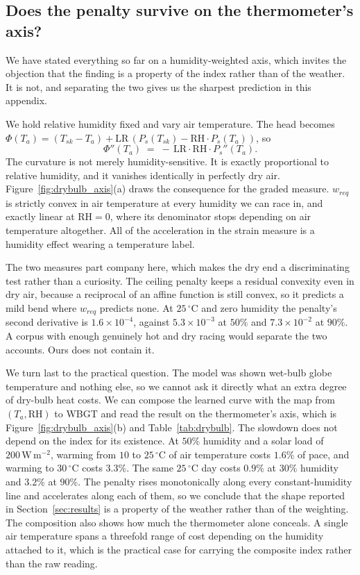 \subsection{Does the penalty survive on the thermometer's axis?}
\label{app:physics:drybulb}

We have stated everything so far on a humidity-weighted axis, which invites the
objection that the finding is a property of the index rather than of the
weather. It is not, and separating the two gives us the sharpest prediction in
this appendix.

We hold relative humidity fixed and vary air temperature. The head becomes
$\Phi(T_a) = (T_{sk} - T_a) + \mathrm{LR}\,(P_s(T_{sk}) - \mathrm{RH}\cdot
P_s(T_a))$, so
\begin{equation}
  \Phi''(T_a) \;=\; -\,\mathrm{LR}\cdot\mathrm{RH}\cdot P_s''(T_a).
  \label{eq:phi-rh}
\end{equation}
The curvature is not merely humidity-sensitive. It is exactly proportional to
relative humidity, and it vanishes identically in perfectly dry air.
Figure~\ref{fig:drybulb_axis}(a) draws the consequence for the graded measure.
$w_{req}$ is strictly convex in air temperature at every humidity we can race
in, and exactly linear at $\mathrm{RH} = 0$, where its denominator stops
depending on air temperature altogether. All of the acceleration in the strain
measure is a humidity effect wearing a temperature label.

The two measures part company here, which makes the dry end a discriminating
test rather than a curiosity. The ceiling penalty keeps a residual convexity
even in dry air, because a reciprocal of an affine function is still convex, so
it predicts a mild bend where $w_{req}$ predicts none. At $25\,^{\circ}$C and
zero humidity the penalty's second derivative is $1.6\times10^{-4}$, against
$5.3\times10^{-3}$ at $50\%$ and $7.3\times10^{-2}$ at $90\%$. A corpus with
enough genuinely hot and dry racing would separate the two accounts. Ours does
not contain it.

We turn last to the practical question. The model was shown wet-bulb globe
temperature and nothing else, so we cannot ask it directly what an extra degree
of dry-bulb heat costs. We can compose the learned curve with the map from
$(T_a, \mathrm{RH})$ to WBGT and read the result on the thermometer's axis,
which is Figure~\ref{fig:drybulb_axis}(b) and Table~\ref{tab:drybulb}. The
slowdown does not depend on the index for its existence. At $50\%$ humidity and
a solar load of $200\,\mathrm{W\,m^{-2}}$, warming from $10$ to $25\,^{\circ}$C
of air temperature costs $1.6\%$ of pace, and warming to $30\,^{\circ}$C costs
$3.3\%$. The same $25\,^{\circ}$C day costs $0.9\%$ at $30\%$ humidity and
$3.2\%$ at $90\%$. The penalty rises monotonically along every constant-humidity
line and accelerates along each of them, so we conclude that the shape reported
in Section~\ref{sec:results} is a property of the weather rather than of the
weighting. The composition also shows how much the thermometer alone conceals. A
single air temperature spans a threefold range of cost depending on the humidity
attached to it, which is the practical case for carrying the composite index
rather than the raw reading.

